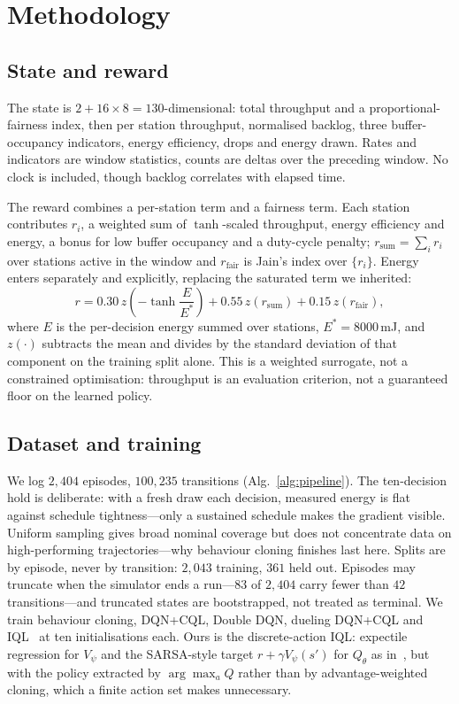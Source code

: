 \section{Methodology}
\label{sec:method}

\subsection{State and reward}

The state is $2 + 16\times 8 = 130$-dimensional: total throughput and a
proportional-fairness index, then per station throughput, normalised backlog,
three buffer-occupancy indicators, energy efficiency, drops and energy drawn.
Rates and indicators are window statistics, counts are deltas over the
preceding window. No clock is included, though backlog correlates with elapsed
time.

The reward combines a per-station term and a fairness term. Each station
contributes $r_i$, a weighted sum of $\tanh$-scaled throughput, energy
efficiency and energy, a bonus for low buffer occupancy and a duty-cycle
penalty; $r_{\mathrm{sum}} = \sum_i r_i$ over stations active in the window
and $r_{\mathrm{fair}}$ is Jain's index over $\{r_i\}$. Energy enters
separately and explicitly, replacing the saturated term we inherited:
\begin{equation}
r = 0.30\,z\!\left(-\tanh\frac{E}{E^{*}}\right) + 0.55\,z(r_{\mathrm{sum}})
    + 0.15\,z(r_{\mathrm{fair}}),
\label{eq:reward}
\end{equation}
where $E$ is the per-decision energy summed over stations, $E^{*}=8000$\,mJ,
and $z(\cdot)$ subtracts the mean and divides by the standard deviation of that
component on the training split alone. This is a weighted surrogate, not a
constrained optimisation: throughput is an evaluation criterion, not a
guaranteed floor on the learned policy.

\subsection{Dataset and training}

We log $2{,}404$ episodes, $100{,}235$ transitions (Alg.~\ref{alg:pipeline}).
The ten-decision hold is deliberate: with a fresh draw each decision, measured
energy is flat against schedule tightness---only a sustained schedule makes the
gradient visible. Uniform sampling gives broad nominal coverage but does not concentrate data on
high-performing trajectories---why behaviour cloning finishes last here. Splits are by episode, never by transition: $2{,}043$ training, $361$
held out. Episodes may truncate when the simulator ends a run---$83$ of
$2{,}404$ carry fewer than $42$ transitions---and truncated states are
bootstrapped, not treated as terminal. We train behaviour cloning, DQN+CQL,
Double DQN, dueling DQN+CQL and
IQL~\cite{kumar2020cql,vanhasselt2016ddqn,kostrikov2022iql} at ten
initialisations each. Ours is the discrete-action IQL: expectile regression for
$V_\psi$ and the SARSA-style target $r + \gamma V_\psi(s')$ for $Q_\theta$
as in~\cite{kostrikov2022iql}, but with the policy extracted by
$\arg\max_a Q$ rather than by advantage-weighted cloning, which a finite
action set makes unnecessary.

